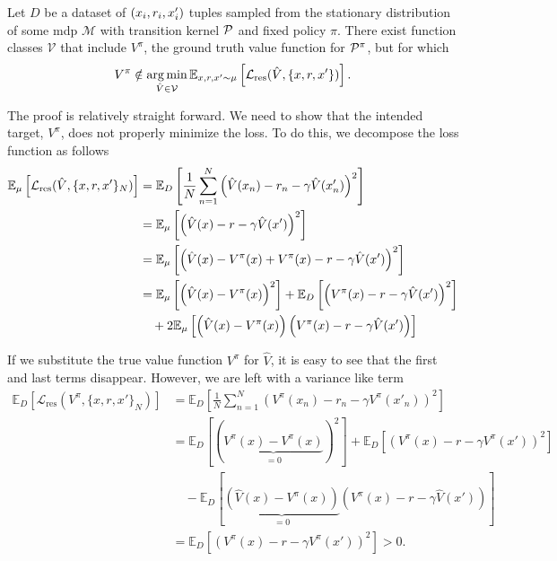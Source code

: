 \begin{proposition}
    Let $D$ be a dataset of $(\state_i,r_i,\state'_i)$ tuples sampled from the stationary distribution of some \ac{mdp}  $\mathcal{M}$ with transition kernel $\P$ and fixed policy $\pi$.
    There exist function classes $\mathcal{V}$ that include $V^\pi$, the ground truth value function for $\P^\pi$, but for which 
    \[V^\pi \notin \argmin_{\hat{V} \in \mathcal{V}} \mathbb{E}_{x,r,x' \sim \mu} \left[\mathcal{L}_\mathrm{res}(\hat{V}, \{\state, r, \state'\})\right].\]
\end{proposition}

The proof is relatively straight forward.
We need to show that the intended target, $V^\pi$, does not properly minimize the loss.
To do this, we decompose the loss function as follows
\begin{align}
    \mathbb{E}_{\mu} \left[\mathcal{L}_\mathrm{res}(\hat{V}, \{\state, r, \state'\}_N)\right] &= \mathbb{E}_{D} \left[\frac{1}{N} \sum_{n=1}^N \left(\hat{V}(\state_n) - r_n - \gamma \hat{V}(\state'_n)\right)^2\right] \\
    &=\mathbb{E}_{\mu} \left[\left(\hat{V}(x) - r - \gamma \hat{V}(x')\right)^2\right] \\
    &=\mathbb{E}_{\mu} \left[\left(\hat{V}(x) - V^\pi(x) + V^\pi(x) - r - \gamma \hat{V}(x')\right)^2\right] \\
    &=\mathbb{E}_{\mu} \left[\left(\hat{V}(x) - V^\pi(x)\right)^2\right] + \mathbb{E}_{D}\left[\left( V^\pi(x) - r - \gamma \hat{V}(x')\right)^2\right] \\
    &\quad + 2 \mathbb{E}_{\mu}\left[\left(\hat{V}(x) - V^\pi(x)\right)\left( V^\pi(x) - r - \gamma \hat{V}(x')\right)\right]
\end{align}

If we substitute the true value function $V^\pi$ for $\hat{V}$, it is easy to see that the first and last terms disappear.
However, we are left with a variance like term
\begin{align}
    \mathbb{E}_{D} \left[\mathcal{L}_\mathrm{res}(V^\pi, \{x, r, x'\}_N)\right] &= \mathbb{E}_{D} \left[\frac{1}{N} \sum_{n=1}^N \left(V^\pi(x_n) - r_n - \gamma V^\pi(x'_n)\right)^2\right] \\
    &=\mathbb{E}_{D} \left[\left(\underbrace{V^\pi(x) - V^\pi(x)}_{=0}\right)^2\right] + \mathbb{E}_{D}\left[\left( V^\pi(x) - r - \gamma V^\pi(x')\right)^2\right] \\
    &\quad - \mathbb{E}_{D}\left[\underbrace{\left(\hat{V}(x) - V^\pi(x)\right)}_{=0}\left( V^\pi(x) - r - \gamma \hat{V}(x')\right)\right]\\
    &=\mathbb{E}_{D}\left[\left( V^\pi(x) - r - \gamma V^\pi(x')\right)^2\right] > 0.
\end{align}

